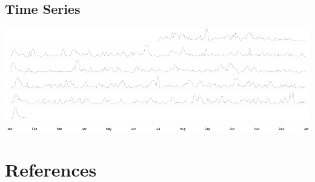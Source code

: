 \documentclass[10pt]{sugconf-ish}
\begin{document}
\subsection{Time Series}
\includegraphics{spark_demand02.pdf}\\
\includegraphics{spark_demand03.pdf}\\
\includegraphics{spark_demand04.pdf}\\
\includegraphics{spark_demand05.pdf}\\
\includegraphics{spark_demand06.pdf}\\
\includegraphics{spark_demand07.pdf}\\
\includegraphics{spark_zero_axis.pdf}\\

\newpage
\section{References}
\end{document}
